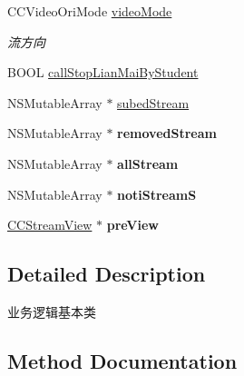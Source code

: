 \begin{DoxyCompactItemize}
C\+C\+Video\+Ori\+Mode \hyperlink{interface_c_c_streamer_basic_a8b77f73f4bf1f194b8eeaeef38d1246d}{video\+Mode}
\begin{DoxyCompactList}\small\item\em 流方向 \end{DoxyCompactList}\item 
B\+O\+OL \hyperlink{interface_c_c_streamer_basic_aa682504571afd589ebd01253fa47f016}{call\+Stop\+Lian\+Mai\+By\+Student}
\item 
N\+S\+Mutable\+Array $\ast$ \hyperlink{interface_c_c_streamer_basic_aa37da66cdd8a8790bfafd4b7bd5cac1d}{subed\+Stream}
\item 
\mbox{\label{interface_c_c_streamer_basic_ade20cd09c942d8d757f36a58f5bbeafb}} 
N\+S\+Mutable\+Array $\ast$ {\bfseries removed\+Stream}
\item 
\mbox{\label{interface_c_c_streamer_basic_a91b72ad1cc66d4d95b74e76e93a7f4e9}} 
N\+S\+Mutable\+Array $\ast$ {\bfseries all\+Stream}
\item 
\mbox{\label{interface_c_c_streamer_basic_a1475f3c49106369cdb5f0c505afd5dcd}} 
N\+S\+Mutable\+Array $\ast$ {\bfseries noti\+StreamS}
\item 
\mbox{\label{interface_c_c_streamer_basic_a8eff4e259f9398452ee12b58805905af}} 
\hyperlink{interface_c_c_stream_view}{C\+C\+Stream\+View} $\ast$ {\bfseries pre\+View}
\end{DoxyCompactItemize}


\subsection{Detailed Description}
业务逻辑基本类 

\subsection{Method Documentation}
\mbox{\label{interface_c_c_streamer_basic_a1030eaa7f4c49132b426ab4f20385ec6}} 
